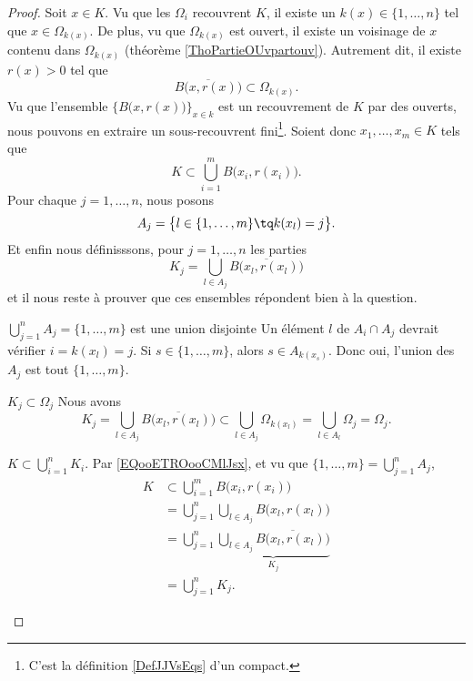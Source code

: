 \begin{proof}
	Soit \( x\in K\). Vu que les \( \Omega_i\) recouvrent \( K\), il existe un \( k(x)\in \{ 1,\ldots, n \}\) tel que \( x\in \Omega_{k(x)}\). De plus, vu que \( \Omega_{k(x)}\) est ouvert, il existe un voisinage de \( x\) contenu dans \( \Omega_{k(x)}\) (théorème \ref{ThoPartieOUvpartouv}). Autrement dit, il existe \( r(x)>0\) tel que
	\begin{equation}
		\overline{ B\big( x,r(x) \big) }\subset  \Omega_{k(x)}.
	\end{equation}
	Vu que l'ensemble \( \{   B\big( x,r(x) \big)    \}_{x\in k}\) est un recouvrement de \( K\) par des ouverts, nous pouvons en extraire un sous-recouvrent fini\footnote{C'est la définition \ref{DefJJVsEqs} d'un compact.}. Soient donc \( x_1,\ldots, x_m\in K\) tels que
	\begin{equation}        \label{EQooETROooCMlJsx}
		K\subset\bigcup_{i=1}^mB\big( x_i, r(x_i) \big).
	\end{equation}
	Pour chaque \( j=1,\ldots, n\), nous posons
	\begin{equation}
		A_j=\big\{ l\in \{ 1,\ldots, m \}\tq k(x_l)=j \big\}.
	\end{equation}
	Et enfin nous définisssons, pour \( j=1,\ldots, n\) les parties
	\begin{equation}
		K_j=\bigcup_{l\in A_j} \overline{ B\big(x_l, r(x_l)\big) }
	\end{equation}
	et il nous reste à prouver que ces ensembles répondent bien à la question.
	\begin{subproof}
		\item[\(  \bigcup_{j=1}^n A_j=\{ 1,\ldots, m \}\) est une union disjointe]
		Un élément \( l\) de \( A_i\cap A_j\) devrait vérifier \( i=k(x_l)=j\). Si \( s\in \{ 1,\ldots, m \}\), alors \( s\in A_{k(x_s)}\). Donc oui, l'union des \( A_j\) est tout \( \{ 1,\ldots, m \}\).
		\item[\(  K_{j}\subset \Omega_j\)]
		Nous avons
		\begin{equation}
			K_j=\bigcup_{l\in A_j}\overline{ B\big( x_l,r(x_l) \big) }\subset  \bigcup_{l\in A_j}\Omega_{k(x_l)}=\bigcup_{l\in A_l}\Omega_{j}=\Omega_j.
		\end{equation}
		\item[\( K\subset\bigcup_{i=1}^nK_i\).]
		Par \eqref{EQooETROooCMlJsx}, et vu que \( \{ 1,\ldots, m \}=\bigcup_{j=1}^nA_j\),
		\begin{subequations}
			\begin{align}
				K & \subset\bigcup_{i=1}^mB\big( x_i, r(x_i) \big)                                            \\
				  & =\bigcup_{j=1}^n\bigcup_{l\in A_j}B\big( x_l,r(x_l) \big)                                 \\
				  & =\bigcup_{j=1}^n\underbrace{\bigcup_{l\in A_j}\overline{  B\big( x_l,r(x_l) \big)}}_{K_j} \\
				  & =\bigcup_{j=1}^nK_j.
			\end{align}
		\end{subequations}
	\end{subproof}
\end{proof}


